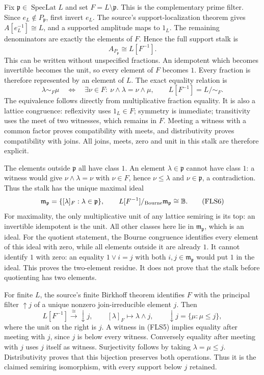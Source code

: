 \documentclass[11pt]{article}
\begin{document}
Fix $\mathfrak p\in\operatorname{SpecLat}L$ and set
$F=L\setminus\mathfrak p$. This is the complementary prime
filter. Since $e_L\notin P_{\mathfrak p}$, first invert
$e_L$. The source's support-localization theorem gives
$A[e_L^{-1}]\cong L$, and a supported amplitude maps to
$1_L$. The remaining denominators are exactly the elements
of $F$. Hence the full support stalk is
\[
A_{P_{\mathfrak p}}\cong L[F^{-1}].
\tag{FLS4}
\]
This can be written without unspecified fractions. An
idempotent which becomes invertible becomes the unit, so
every element of $F$ becomes $1$. Every fraction is therefore
represented by an element of $L$. The exact equality relation is
\[
\lambda\sim_F\mu
\quad\Longleftrightarrow\quad
\exists\nu\in F:\ \nu\wedge\lambda=\nu\wedge\mu,
\qquad L[F^{-1}]=L/{\sim_F}.
\tag{FLS5}
\]
The equivalence follows directly from multiplicative fraction
equality. It is also a lattice congruence: reflexivity uses
$1_L\in F$; symmetry is immediate; transitivity uses the
meet of two witnesses, which remains in $F$. Meeting a witness
with a common factor proves compatibility with meets, and
distributivity proves compatibility with joins. All joins,
meets, zero and unit in this stalk are therefore explicit.

The elements outside $\mathfrak p$ all have class $1$.
An element $\lambda\in\mathfrak p$ cannot have class $1$:
a witness would give $\nu\wedge\lambda=\nu$ with
$\nu\in F$, hence $\nu\leq\lambda$ and $\nu\in\mathfrak p$,
a contradiction. Thus the stalk has the unique maximal ideal
\[
\mathfrak m_{\mathfrak p}
=\{[\lambda]_F:\lambda\in\mathfrak p\},
\qquad
L[F^{-1}]/_{\rm Bourne}\mathfrak m_{\mathfrak p}
\cong\mathbb B.
\tag{FLS6}
\]
For maximality, the only multiplicative unit of any lattice
semiring is its top: an invertible idempotent is the unit.
All other classes here lie in $\mathfrak m_{\mathfrak p}$,
which is an ideal. For the quotient statement, the Bourne
congruence identifies every element of this ideal with zero,
while all elements outside it are already $1$. It cannot
identify $1$ with zero: an equality $1\vee i=j$ with both
$i,j\in\mathfrak m_{\mathfrak p}$ would put $1$ in the ideal.
This proves the two-element residue. It does not prove that
the stalk before quotienting has two elements.

For finite $L$, the source's finite Birkhoff theorem identifies
$F$ with the principal filter $\uparrow j$ of a unique
nonzero join-irreducible element $j$. Then
\[
L[F^{-1}]\xrightarrow{\ \cong\ }\downarrow j,
\qquad[\lambda]_F\longmapsto\lambda\wedge j,
\qquad \downarrow j=\{\mu:\mu\leq j\},
\tag{FLS7}
\]
where the unit on the right is $j$. A witness in (FLS5)
implies equality after meeting with $j$, since $j$ is below
every witness. Conversely equality after meeting with $j$
uses $j$ itself as witness. Surjectivity follows by taking
$\lambda=\mu\leq j$. Distributivity proves that this
bijection preserves both operations. Thus it is the claimed
semiring isomorphism, with every support below $j$ retained.
\end{document}
